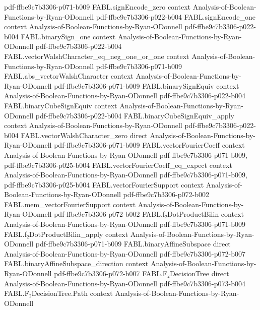 \begin{theorem}
  {pdf-ffbe9c7b3306-p071-b009}
\proofstep
  {FABL.signEncode_zero}
  {context}
  {Analysis-of-Boolean-Functions-by-Ryan-ODonnell}
  {pdf-ffbe9c7b3306-p022-b004}
\proofstep
  {FABL.signEncode_one}
  {context}
  {Analysis-of-Boolean-Functions-by-Ryan-ODonnell}
  {pdf-ffbe9c7b3306-p022-b004}
\proofstep
  {FABL.binarySign_one}
  {context}
  {Analysis-of-Boolean-Functions-by-Ryan-ODonnell}
  {pdf-ffbe9c7b3306-p022-b004}
\proofstep
  {FABL.vectorWalshCharacter_eq_neg_one_or_one}
  {context}
  {Analysis-of-Boolean-Functions-by-Ryan-ODonnell}
  {pdf-ffbe9c7b3306-p071-b009}
\proofstep
  {FABL.abs_vectorWalshCharacter}
  {context}
  {Analysis-of-Boolean-Functions-by-Ryan-ODonnell}
  {pdf-ffbe9c7b3306-p071-b009}
\proofstep
  {FABL.binarySignEquiv}
  {context}
  {Analysis-of-Boolean-Functions-by-Ryan-ODonnell}
  {pdf-ffbe9c7b3306-p022-b004}
\proofstep
  {FABL.binaryCubeSignEquiv}
  {context}
  {Analysis-of-Boolean-Functions-by-Ryan-ODonnell}
  {pdf-ffbe9c7b3306-p022-b004}
\proofstep
  {FABL.binaryCubeSignEquiv_apply}
  {context}
  {Analysis-of-Boolean-Functions-by-Ryan-ODonnell}
  {pdf-ffbe9c7b3306-p022-b004}
\proofstep
  {FABL.vectorWalshCharacter_zero}
  {direct}
  {Analysis-of-Boolean-Functions-by-Ryan-ODonnell}
  {pdf-ffbe9c7b3306-p071-b009}
\proofstep
  {FABL.vectorFourierCoeff}
  {context}
  {Analysis-of-Boolean-Functions-by-Ryan-ODonnell}
  {pdf-ffbe9c7b3306-p071-b009,
    pdf-ffbe9c7b3306-p025-b004}
\proofstep
  {FABL.vectorFourierCoeff_eq_expect}
  {context}
  {Analysis-of-Boolean-Functions-by-Ryan-ODonnell}
  {pdf-ffbe9c7b3306-p071-b009,
    pdf-ffbe9c7b3306-p025-b004}
\proofstep
  {FABL.vectorFourierSupport}
  {context}
  {Analysis-of-Boolean-Functions-by-Ryan-ODonnell}
  {pdf-ffbe9c7b3306-p072-b002}
\proofstep
  {FABL.mem_vectorFourierSupport}
  {context}
  {Analysis-of-Boolean-Functions-by-Ryan-ODonnell}
  {pdf-ffbe9c7b3306-p072-b002}
\proofstep
  {FABL.f₂DotProductBilin}
  {context}
  {Analysis-of-Boolean-Functions-by-Ryan-ODonnell}
  {pdf-ffbe9c7b3306-p071-b009}
\proofstep
  {FABL.f₂DotProductBilin_apply}
  {context}
  {Analysis-of-Boolean-Functions-by-Ryan-ODonnell}
  {pdf-ffbe9c7b3306-p071-b009}
\proofstep
  {FABL.binaryAffineSubspace}
  {direct}
  {Analysis-of-Boolean-Functions-by-Ryan-ODonnell}
  {pdf-ffbe9c7b3306-p072-b007}
\proofstep
  {FABL.binaryAffineSubspace_direction}
  {context}
  {Analysis-of-Boolean-Functions-by-Ryan-ODonnell}
  {pdf-ffbe9c7b3306-p072-b007}
\proofstep
  {FABL.F₂DecisionTree}
  {direct}
  {Analysis-of-Boolean-Functions-by-Ryan-ODonnell}
  {pdf-ffbe9c7b3306-p073-b004}
\proofstep
  {FABL.F₂DecisionTree.Path}
  {context}
  {Analysis-of-Boolean-Functions-by-Ryan-ODonnell}

\end{theorem}
